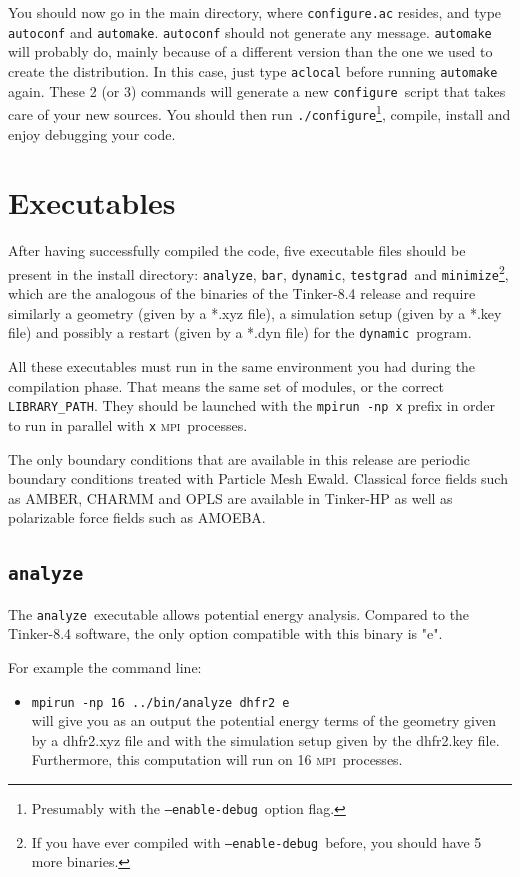 \documentclass[peerreview]{IEEEtran}
\def\mpi{\textsc{mpi}}
\def\config{\texttt{configure}}
\def\configp{\texttt{./}\config}
\def\enadeb{\texttt{--enable-debug}}
\def\analyze{\texttt{analyze}}
\def\bar{\texttt{bar}}
\def\dynamic{\texttt{dynamic}}
\def\minimize{\texttt{minimize}}
\def\testgrad{\texttt{testgrad}}
\def\mpirun{\texttt{mpirun -np}}
\begin{document}
You should now go in the main directory, where \texttt{configure.ac} resides, and type \texttt{autoconf} and \texttt{automake}. \texttt{autoconf} should not generate any message. \texttt{automake} will probably do, mainly because of a different version than the one we used to create the distribution. In this case, just type \texttt{aclocal} before running \texttt{automake} again. These 2 (or 3) commands will generate a new \config\ script that takes care of your new sources. You should then run \configp\footnote{Presumably with the \enadeb\ option flag.}, compile, install and enjoy debugging your code.

\section{Executables}
After having successfully compiled the code, five executable files should be present in the install directory: \analyze, \bar, \dynamic, \testgrad\ and \minimize\footnote{If you have ever compiled with \enadeb\ before, you should  have 5 more binaries.}, which are the analogous of the binaries of the Tinker-8.4 release and require similarly a geometry (given by a *.xyz file), a simulation setup (given by a *.key file) and possibly a restart (given by a *.dyn file) for the \dynamic\ program. 

All these executables must run in the same environment you had during the compilation phase. That means the same set of modules, or the correct \texttt{LIBRARY\_PATH}. They should be launched with the \mpirun\texttt{ x} prefix in order to run in parallel with \texttt{x} \mpi\  processes. 

The only boundary conditions that are available in this release are periodic boundary conditions treated with Particle Mesh Ewald. Classical force fields such as AMBER, CHARMM and OPLS are available in Tinker-HP as well as polarizable force fields such as AMOEBA.
\subsection{\analyze\ } 
The \analyze\ executable allows potential energy analysis. Compared to the Tinker-8.4 software, the only option compatible with this binary is "e".

For example the command line: 
\begin{itemize}
\item[] \mpirun\texttt{ 16 ../bin/analyze dhfr2 e} \\
will give you as an output the potential energy terms of the geometry given by a dhfr2.xyz file and with the simulation setup given by the dhfr2.key file. Furthermore, this computation will run on 16 \mpi\  processes.
\end{itemize}
\end{document}
